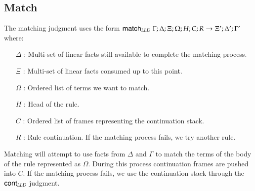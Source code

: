 \subsection{Match}

The matching judgment uses the form $\mathsf{match}_{LLD} \; \Gamma; \Delta; \Xi; \Omega; H; C; R \rightarrow \Xi'; \Delta'; \Gamma'$ where:

\begin{enumerate}
   \item[$\Delta$]: Multi-set of linear facts still available to complete the matching process.
   \item[$\Xi$]: Multi-set of linear facts consumed up to this point.
   \item[$\Omega$]: Ordered list of terms we want to match.
   \item[$H$]: Head of the rule.
   \item[$C$]: Ordered list of frames representing the continuation stack.
   \item[$R$]: Rule continuation. If the matching process fails, we try another rule.
\end{enumerate}

Matching will attempt to use facts from $\Delta$ and $\Gamma$ to match the terms of the body of the rule represented as $\Omega$. During this process continuation frames are pushed into $C$.
If the matching process fails, we use the continuation stack through the $\mathsf{cont}_{LLD} \;$judgment.


